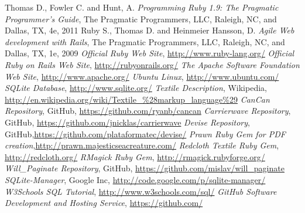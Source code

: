 \documentclass[12pt,twoside]{article}
\begin{document}
\newpage
\begin{thebibliography}{2}
 Thomas D., Fowler C. and Hunt, A.
\emph{Programming Ruby 1.9: The Pragmatic Programmer's Guide}, The Pragmatic Programmers, LLC, Raleigh, NC, and Dallas, TX, 4e, 2011
 Ruby S., Thomas D. and Heinmeier Hansson, D.
\emph{Agile Web development with Rails}, The Pragmatic Programmers, LLC, Raleigh, NC, and Dallas, TX, 1e, 2009
 \emph{Official Ruby Web Site}, \url{http://www.ruby-lang.org/}
 \emph{Official Ruby on Rails Web Site}, \url{http://rubyonrails.org/}
 \emph{The Apache Software Foundation Web Site}, \url{http://www.apache.org/}
 \emph{Ubuntu Linux}, \url{http://www.ubuntu.com/}
 \emph{SQLite Database}, \url{http://www.sqlite.org/}
 \emph{Textile Description}, Wikipedia, \url{http://en.wikipedia.org/wiki/Textile_%28markup_language%29}
 \emph{CanCan Repository}, GitHub, \url{https://github.com/ryanb/cancan}
 \emph{Carrierwave Repository}, GitHub, \url{https://github.com/jnicklas/carrierwave}
 \emph{Devise Repository}, GitHub,\url{https://github.com/plataformatec/devise/}
 \emph{Prawn Ruby Gem for PDF creation},\url{http://prawn.majesticseacreature.com/}
 \emph{Redcloth Textile Ruby Gem}, \url{http://redcloth.org/}
 \emph{RMagick Ruby Gem}, \url{http://rmagick.rubyforge.org/}
 \emph{Will\_Paginate Repository}, GitHub, \url{https://github.com/mislav/will_paginate}
 \emph{SQLite-Manager}, Google Inc, \url{http://code.google.com/p/sqlite-manager/}
 \emph{W3Schools SQL Tutorial}, \url{http://www.w3schools.com/sql/}
 \emph{GitHub Software Development and Hosting Service}, \url{https://github.com/}
\end{thebibliography}
\end{document}
